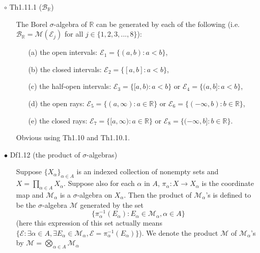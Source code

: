 \documentclass{article}
\begin{document}
{\Large $\circ $ Th1.11.1 ($\mathcal{B}_{\mathbb{R}}$)}\par
\begin{itemize}
    \item[]
    {\large The Borel $\sigma$-algebra of $\mathbb{R}$ can be generated by each of the following
    (i.e. $\mathcal{B}_{\mathbb{R}} = \mathcal{M}(\mathcal{E}_j)$ for all $j\in \{1,2,3,...,8\}$):
    \begin{enumerate}
        \item[(a)] the open intervals: $\mathcal{E}_1 = \{(a,b):a<b\}$,
        \item[(b)] the closed intervals: $\mathcal{E}_2 = \{[a,b]:a<b\}$,
        \item[(c)] the half-open intervals: $\mathcal{E}_3 = \{[a,b):a<b\}$ or $\mathcal{E}_4 = \{(a,b]:a<b\}$,
        \item[(d)] the open rays: $\mathcal{E}_5 = \{(a,\infty):a\in \mathbb{R}\}$ or 
        $\mathcal{E}_6 = \{(-\infty,b):b\in \mathbb{R}\}$,
        \item[(e)] the closed rays: $\mathcal{E}_7 = \{[a,\infty):a\in \mathbb{R}\}$ or 
        $\mathcal{E}_8 = \{(-\infty,b]:b\in \mathbb{R}\}$. 
    \end{enumerate}}
    {\textcolor{pf}{Obvious using Th1.10 and Th1.10.1.}}
\end{itemize}\par
\quad

{\Large $\bullet $ Df1.12 (the product of $\sigma$-algebras)}\par
\begin{itemize}
    \item[]
    {\large Suppose $\{X_\alpha\}_{\alpha\in A}$ is an indexed collection of nonempty sets 
    and $X=\prod_{\alpha\in A}X_\alpha$. Suppose also for each $\alpha$ in $A$, 
    $\pi_\alpha:X\rightarrow X_\alpha$ is the coordinate map and $\mathcal{M}_\alpha$ is a $\sigma$-algebra
    on $X_\alpha$. Then the product of $\mathcal{M}_\alpha$'s is defined to be the 
    $\sigma$-algebra $\mathcal{M}$ generated by the set
    $$\{\pi_{\alpha}^{-1}(E_\alpha):E_\alpha \in \mathcal{M}_\alpha, \alpha\in A\}$$
    (here this expression of this set actually means 
    $\{\mathcal{E}:\exists\alpha\in A,\exists E_\alpha\in\mathcal{M}_\alpha,\mathcal{E}=\pi_{\alpha}^{-1}(E_\alpha)\}$).
    We denote the product $\mathcal{M}$ of $\mathcal{M}_\alpha$'s 
    by $\mathcal{M}=\bigotimes_{\alpha\in A}\mathcal{M}_\alpha$}
\end{itemize}\par
\quad
\end{document}
